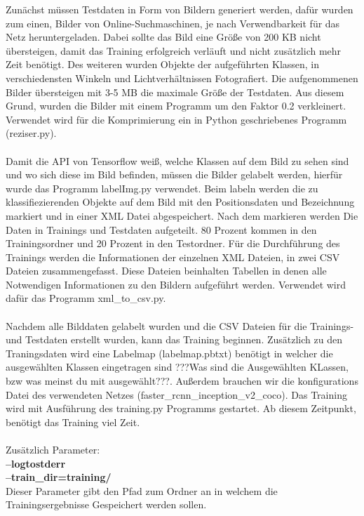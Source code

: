 \documentclass[a4paper,12pt,oneside]{article}
\begin{document}
Zunächst müssen Testdaten in Form von Bildern generiert werden, dafür wurden zum einen, Bilder von Online-Suchmaschinen, je nach Verwendbarkeit für das Netz heruntergeladen. Dabei sollte das Bild eine Größe von 200 KB nicht übersteigen, damit das Training erfolgreich verläuft und nicht zusätzlich mehr Zeit benötigt. Des weiteren wurden Objekte der aufgeführten Klassen, in verschiedensten Winkeln und Lichtverhältnissen Fotografiert. Die aufgenommenen Bilder übersteigen mit 3-5 MB die maximale Größe der Testdaten. Aus diesem Grund, wurden die Bilder mit einem Programm um den Faktor 0.2 verkleinert. Verwendet wird für die Komprimierung ein in Python geschriebenes Programm (reziser.py).\\
\\
Damit die API von Tensorflow weiß, welche Klassen auf dem Bild zu sehen sind und wo sich diese im Bild befinden, müssen die Bilder gelabelt werden, hierfür wurde das Programm labelImg.py verwendet. Beim labeln werden die zu klassifiezierenden Objekte auf dem Bild mit den Positionsdaten und Bezeichnung markiert und in einer XML Datei abgespeichert. Nach dem markieren werden Die Daten in Trainings und Testdaten aufgeteilt. 80 Prozent kommen in den Trainingsordner und 20 Prozent in den Testordner. Für die Durchführung des Trainings werden die Informationen der einzelnen XML Dateien, in zwei CSV Dateien zusammengefasst. Diese Dateien beinhalten Tabellen in denen alle Notwendigen Informationen zu den Bildern aufgeführt werden. Verwendet wird dafür das Programm xml\_to\_csv.py.\\
\\
Nachdem alle Bilddaten gelabelt wurden und die CSV Dateien für die Trainings- und Testdaten erstellt wurden, kann das Training beginnen. Zusätzlich zu den Traningsdaten wird eine  Labelmap (labelmap.pbtxt) benötigt in welcher die ausgewählten Klassen eingetragen sind ???Was sind die Ausgewählten KLassen, bzw was meinst du mit ausgewählt???. Außerdem brauchen wir die konfigurations Datei des verwendeten Netzes (faster\_rcnn\_inception\_v2\_coco). Das Training wird mit Ausführung des training.py Programms gestartet. Ab diesem Zeitpunkt, benötigt das Training viel Zeit.\\\\
Zusätzlich Parameter: \\
\textbf{--logtostderr}\\
\textbf{--train\_dir=training/}\\
Dieser Parameter gibt den Pfad zum Ordner an in welchem die Trainingsergebnisse Gespeichert werden sollen.\\
\end{document}
